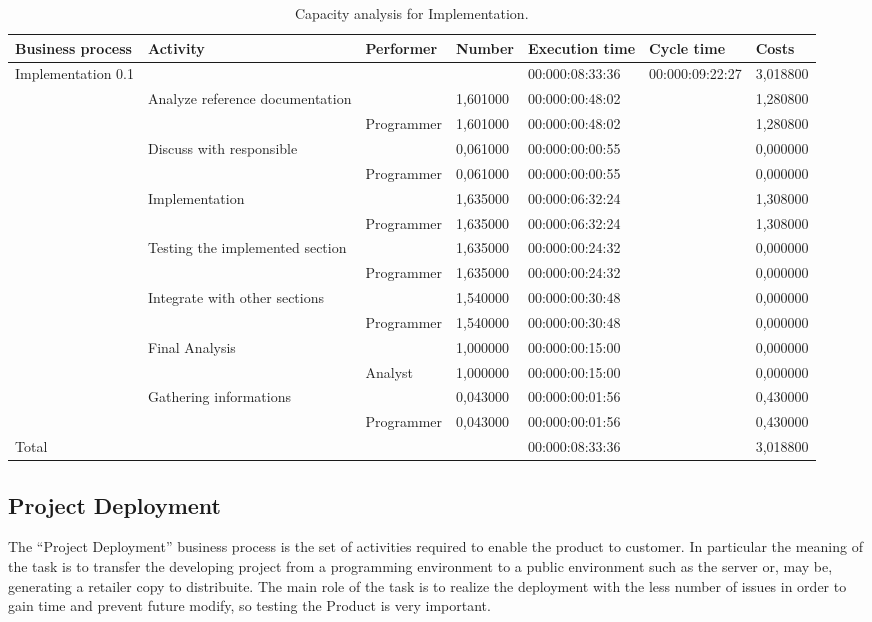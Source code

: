\begin{landscape}
\begin{table}
\centering
{\tiny
\begin{tabular}{|l|l|l|l|l|l|l|}
\hline
Business process&Activity&Performer&Number&Execution time&Cycle time&Costs\\
\hline
Implementation 0.1&&&&00:000:08:33:36&00:000:09:22:27&3,018800\\
\hline
&Analyze reference documentation &&1,601000&00:000:00:48:02&&1,280800\\
\hline
&&Programmer &1,601000&00:000:00:48:02&&1,280800\\
\hline
&Discuss with responsible &&0,061000&00:000:00:00:55&&0,000000\\
\hline
&&Programmer &0,061000&00:000:00:00:55&&0,000000\\
\hline
&Implementation &&1,635000&00:000:06:32:24&&1,308000\\
\hline
&&Programmer &1,635000&00:000:06:32:24&&1,308000\\
\hline
&Testing the implemented section &&1,635000&00:000:00:24:32&&0,000000\\
\hline
&&Programmer &1,635000&00:000:00:24:32&&0,000000\\
\hline
&Integrate with other sections &&1,540000&00:000:00:30:48&&0,000000\\
\hline
&&Programmer &1,540000&00:000:00:30:48&&0,000000\\
\hline
&Final Analysis &&1,000000&00:000:00:15:00&&0,000000\\
\hline
&&Analyst &1,000000&00:000:00:15:00&&0,000000\\
\hline
&Gathering informations &&0,043000&00:000:00:01:56&&0,430000\\
\hline
&&Programmer &0,043000&00:000:00:01:56&&0,430000\\
\hline
Total&&&&00:000:08:33:36&&3,018800\\
\hline
\end{tabular}
}
\caption{Capacity analysis for Implementation.}
\end{table}
\end{landscape}
%

%

\subsection{Project Deployment}
The ``Project Deployment'' business process is the set of activities required to enable the product to customer. In particular the meaning of the task is to transfer the developing project from a programming environment to a public environment such as the server or, may be, generating a retailer copy to distribuite. The main role of the task is to realize the deployment with the less number of issues in order to gain time and prevent future modify, so testing the Product is very important.

